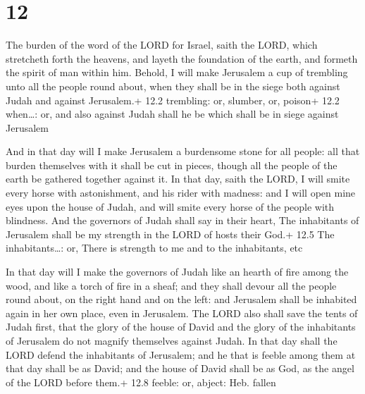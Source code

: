 \hypertarget{section-11}{%
\section{12}\label{section-11}}

 The burden of the word of the LORD for Israel, saith the
LORD, which stretcheth forth the heavens, and layeth the foundation of
the earth, and formeth the spirit of man within him. 
Behold, I will make Jerusalem a cup of trembling unto all the people
round about, when they shall be in the siege both against Judah and
against Jerusalem.+ 12.2 trembling: or, slumber, or, poison+ 12.2
when\ldots: or, and also against Judah shall he be which shall be in
siege against Jerusalem

 And in that day will I make Jerusalem a burdensome stone
for all people: all that burden themselves with it shall be cut in
pieces, though all the people of the earth be gathered together against
it.  In that day, saith the LORD, I will smite every horse
with astonishment, and his rider with madness: and I will open mine eyes
upon the house of Judah, and will smite every horse of the people with
blindness.  And the governors of Judah shall say in their
heart, The inhabitants of Jerusalem shall be my strength in the LORD of
hosts their God.+ 12.5 The inhabitants\ldots: or, There is strength to
me and to the inhabitants, etc

 In that day will I make the governors of Judah like an
hearth of fire among the wood, and like a torch of fire in a sheaf; and
they shall devour all the people round about, on the right hand and on
the left: and Jerusalem shall be inhabited again in her own place, even
in Jerusalem.  The LORD also shall save the tents of Judah
first, that the glory of the house of David and the glory of the
inhabitants of Jerusalem do not magnify themselves against Judah.
 In that day shall the LORD defend the inhabitants of
Jerusalem; and he that is feeble among them at that day shall be as
David; and the house of David shall be as God, as the angel of the LORD
before them.+ 12.8 feeble: or, abject: Heb. fallen

